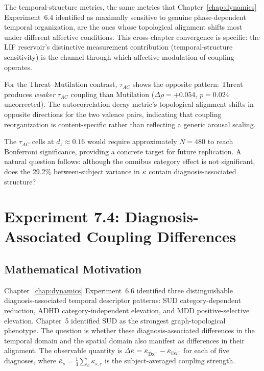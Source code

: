 The temporal-structure metrics, the same metrics that Chapter~\ref{chap:dynamics} Experiment~6.4 identified as maximally sensitive to genuine phase-dependent temporal organization, are the ones whose topological alignment shifts most under different affective conditions. This cross-chapter convergence is specific: the LIF reservoir's distinctive measurement contribution (temporal-structure sensitivity) is the channel through which affective modulation of coupling operates.

For the Threat--Mutilation contrast, $\tau_{AC}$ shows the opposite pattern: Threat produces \emph{weaker} $\tau_{AC}$ coupling than Mutilation ($\Delta\rho = +0.054$, $p = 0.024$ uncorrected). The autocorrelation decay metric's topological alignment shifts in opposite directions for the two valence pairs, indicating that coupling reorganization is content-specific rather than reflecting a generic arousal scaling.

The $\tau_{AC}$ cells at $d_z \approx 0.16$ would require approximately $N = 480$ to reach Bonferroni significance, providing a concrete target for future replication. A natural question follows: although the omnibus category effect is not significant, does the 29.2\% between-subject variance in $\kappa$ contain diagnosis-associated structure?


\section{Experiment 7.4: Diagnosis-Associated Coupling Differences}
\label{sec:exp7_diagnosis}

\subsection{Mathematical Motivation}

Chapter~\ref{chap:dynamics} Experiment~6.6 identified three distinguishable diagnosis-associated temporal descriptor patterns: SUD category-dependent reduction, ADHD category-independent elevation, and MDD positive-selective elevation. Chapter~5 identified SUD as the strongest graph-topological phenotype. The question is whether these diagnosis-associated differences in the temporal domain and the spatial domain also manifest as differences in their alignment. The observable quantity is $\Delta\bar{\kappa} = \bar{\kappa}_{\text{Dx}^+} - \bar{\kappa}_{\text{Dx}^-}$ for each of five diagnoses, where $\bar{\kappa}_s = \frac{1}{4}\sum_c \kappa_{s,c}$ is the subject-averaged coupling strength.

